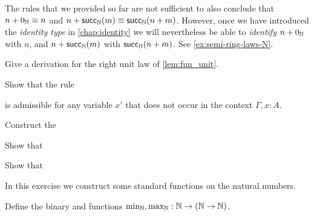 \begin{rmk}
The rules that we provided so far are not sufficient to also conclude that $n+\zeroN\jdeq n$ and $n+ \succN(m)\jdeq \succN(n+m)$. However, once we have introduced the \emph{identity type} in \cref{chap:identity} we will nevertheless be able to \emph{identify} $n+\zeroN$ with $n$, and $n+ \succN(m)$ with $\succN(n+m)$. See \cref{ex:semi-ring-laws-N}. 
\end{rmk}

\begin{exercises}
\item \label{ex:fun_right_unit}Give a derivation for the right unit law of \cref{lem:fun_unit}.
\item Show that the rule
\begin{prooftree}
\end{prooftree}
is admissible for any variable $x'$ that does not occur in the context $\Gamma,x:A$.
\item 
  \begin{subexenum}
  \item Construct the 
    \begin{prooftree}
    \end{prooftree}
  \item Show that
    \begin{prooftree}
    \end{prooftree}
  \item Show that
    \begin{prooftree}
    \end{prooftree}
  \end{subexenum}
\item In this exercise we construct some standard functions on the natural numbers.
  \begin{subexenum}
  \item Define the binary  and  functions $\min_\N,\max_\N:\N\to(\N\to\N)$.

\end{subexenum}
\end{exercises}
